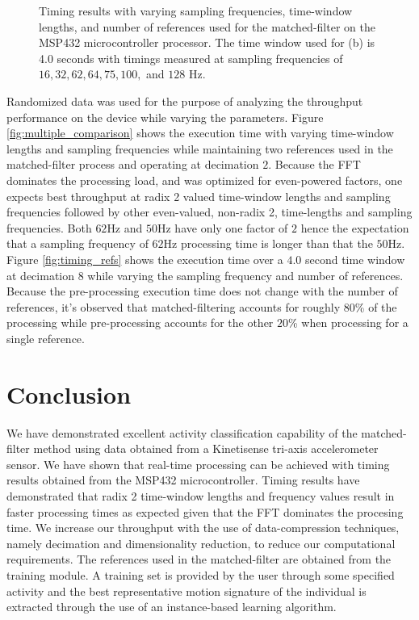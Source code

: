 \documentclass[journal]{IEEEtran}
\begin{document}
\begin{figure}[!ht]
   \centering
   \quad
   \caption{Timing results with varying sampling frequencies, time-window lengths, and number of references used for the matched-filter on the MSP432 microcontroller processor. The time window used for (b) is 4.0 seconds with timings measured at sampling frequencies of $16, 32, 62, 64, 75, 100,$ and $128$ Hz.}
   \label{fig:timing}
\end{figure}
%
Randomized data was used for the purpose of analyzing the throughput performance on the device while varying the parameters.
Figure \ref{fig:multiple_comparison} shows the execution time with varying time-window lengths and sampling frequencies while maintaining two references used in the matched-filter process and operating at decimation $2$.
Because the FFT dominates the processing load, and was optimized for even-powered factors, one expects best throughput at radix 2 valued time-window lengths and sampling frequencies followed by other even-valued, non-radix 2, time-lengths and sampling frequencies. Both $62$Hz and $50$Hz have only one factor of $2$ hence the expectation that a sampling frequency of $62$Hz processing time is longer than that the $50$Hz.
Figure \ref{fig:timing_refs} shows the execution time over a $4.0$ second time window at decimation $8$ while varying the sampling frequency and number of references. Because the pre-processing execution time does not change with the number of references, it's observed that matched-filtering accounts for roughly $80$\% of the processing while pre-processing accounts for the other $20$\% when processing for a single reference.
%
\section{Conclusion}
We have demonstrated excellent activity classification capability of the matched-filter method using data obtained from a Kinetisense tri-axis accelerometer sensor.
We have shown that real-time processing can be achieved with timing results obtained from the MSP432 microcontroller.
Timing results have demonstrated that radix 2 time-window lengths and frequency values result in faster processing times as expected given that the FFT dominates the procesing time.
We increase our throughput with the use of data-compression techniques, namely decimation and dimensionality reduction, to reduce our computational requirements.
The references used in the matched-filter are obtained from the training module.
A training set is provided by the user through some specified activity and the best representative motion signature of the individual is extracted through the use of an instance-based learning algorithm.

%
\appendices
%
\ifCLASSOPTIONcaptionsoff
  \newpage
\fi
%


\end{document}
